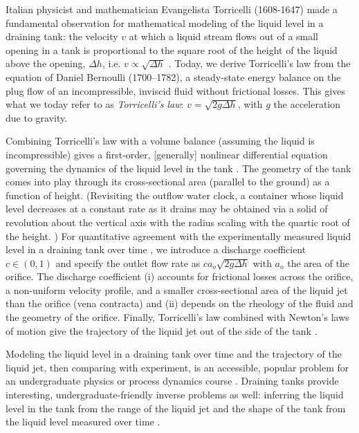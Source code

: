 \documentclass[openacc]{rsproca_new}%
\begin{document}
Italian physicist and mathematician Evangelista Torricelli (1608-1647) made a fundamental observation for mathematical modeling of the liquid level in a draining tank: the velocity $v$ at which a liquid stream flows out of a small opening in a tank is proportional to the square root of the height of the liquid above the opening, $\Delta h$, i.e. $v\propto \sqrt{\Delta h}$ \cite{mills1982newton}. Today, we derive Torricelli's law from the equation of Daniel Bernoulli (1700–1782), a steady-state energy balance on the plug flow of an incompressible, inviscid fluid without frictional losses. This gives what we today refer to as \emph{Torricelli's law}: $v=\sqrt{2 g \Delta h}$, with $g$ the acceleration due to gravity. \cite{d2021torricelli} 

Combining Torricelli's law with a volume balance (assuming the liquid is incompressible) gives a first-order, [generally] nonlinear differential equation governing the dynamics of the liquid level in the tank \cite{groetsch1993inverse,seborg2016process}. The geometry of the tank comes into play through its cross-sectional area (parallel to the ground) as a function of height.
(Revisiting the outflow water clock, a container whose liquid level decreases at a constant rate as it drains may be obtained via a solid of revolution about the vertical axis with the radius scaling with the quartic root of the height. \cite{mills1982newton,d2021torricelli}) 
For quantitative agreement with the experimentally measured liquid level in a draining tank over time \cite{de2000pin,blasone2015discharge,wadhwa2021study,liu2008drainage}, we introduce a discharge coefficient $c\in (0, 1)$ and specify the outlet flow rate as $c a_o \sqrt{2 g \Delta h}$ with $a_o$ the area of the orifice. 
The discharge coefficient (i) accounts for frictional losses across the orifice, a non-uniform velocity profile, and a smaller cross-sectional area of the liquid jet than the orifice (vena contracta) and (ii) depends on the rheology of the fluid and the geometry of the orifice. \cite{teoman2022discharge,hicks2014determining,blasone2015discharge}
Finally, Torricelli's law combined with Newton's laws of motion give the trajectory of the liquid jet out of the side of the tank \cite{groetsch1999inverse}.

Modeling the liquid level in a draining tank over time and the trajectory of the liquid jet, then comparing with experiment, is an accessible, popular problem for an undergraduate physics or process dynamics course \cite{farmer1992physical,driver1998torricelli,brady2009siphons,rother2024modelling,paldy1963apparatus,ivanov2014testing,williams2021vessel,pavesi2019investigating,planinvsivc2011holes,saleta2005experimental,lopac2015water}. Draining tanks provide interesting, undergraduate-friendly inverse problems \cite{groetsch1993inverse,neto2012introduction,tarantola2005inverse} as well: inferring the liquid level in the tank from the range of the liquid jet and the shape of the tank from the liquid level measured over time \cite{groetsch1993inverse,groetsch1999inverse}.
\end{document}
